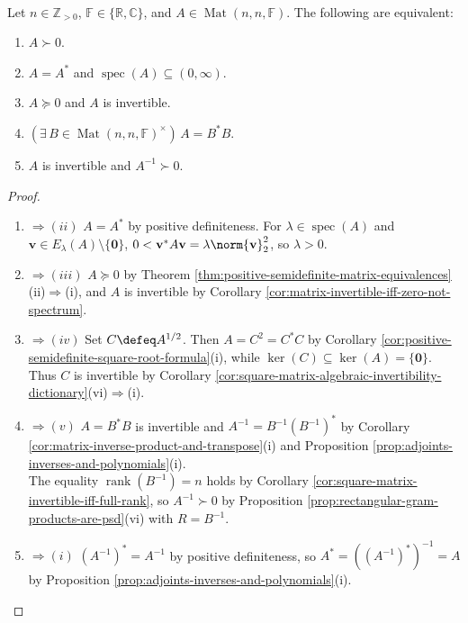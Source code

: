 \begin{theorem} \label{thm:positive-definite-matrix-equivalences} \\
Let $n\in\mathbb{Z}_{>0}$, $\mathbb{F}\in\{\mathbb{R},\mathbb{C}\}$, and $A\in\operatorname{Mat}(n,n,\mathbb{F})$. The following are equivalent:
\begin{enumerate}[label=(\roman*)]
\setlength{\itemsep}{0pt}
\item $A\succ0$.
\item $A=A^*$ and $\operatorname{spec}(A)\subseteq(0,\infty)$.
\item $A\succeq0$ and $A$ is invertible.
\item $(\exists\,B\in\operatorname{Mat}(n,n,\mathbb{F})^\times)\,A=B^*B$.
\item $A$ is invertible and $A^{-1}\succ0$.
\end{enumerate}
\begin{proof}
\begin{enumerate}[label=(\roman*)]
\setlength{\itemsep}{0pt}
\item[$(i)$]$\Rightarrow (ii)$ $A=A^*$ by positive definiteness. For $\lambda\in\operatorname{spec}(A)$ and $\mathbf{v}\in E_\lambda(A)\setminus\{\mathbf{0}\}$, $0<\mathbf{v}^*A\mathbf{v}=\lambda\norm{\mathbf{v}}_2^2$, so $\lambda>0$. \item[$(ii)$]$\Rightarrow (iii)$ $A\succeq0$ by Theorem \ref{thm:positive-semidefinite-matrix-equivalences}(ii)$\Rightarrow$(i), and $A$ is invertible by Corollary \ref{cor:matrix-invertible-iff-zero-not-spectrum}. 
\item[$(iii)$]$\Rightarrow (iv)$ Set $C\defeq A^{1/2}$. Then $A=C^2=C^*C$ by Corollary \ref{cor:positive-semidefinite-square-root-formula}(i), while $\ker(C)\subseteq\ker(A)=\{\mathbf{0}\}$.\\
Thus $C$ is invertible by Corollary \ref{cor:square-matrix-algebraic-invertibility-dictionary}(vi)$\Rightarrow$(i). 
\item[$(iv)$]$\Rightarrow (v)$ $A=B^*B$ is invertible and $A^{-1}=B^{-1}(B^{-1})^*$ by Corollary \ref{cor:matrix-inverse-product-and-transpose}(i) and Proposition \ref{prop:adjoints-inverses-and-polynomials}(i).\\
The equality $\operatorname{rank}(B^{-1})=n$ holds by Corollary \ref{cor:square-matrix-invertible-iff-full-rank}, so $A^{-1}\succ0$ by Proposition \ref{prop:rectangular-gram-products-are-psd}(vi) with $R=B^{-1}$.
 \item[$(v)$]$\Rightarrow (i)$ $(A^{-1})^*=A^{-1}$ by positive definiteness, so $A^*=((A^{-1})^*)^{-1}=A$ by Proposition \ref{prop:adjoints-inverses-and-polynomials}(i).\\

\end{enumerate}
\end{proof}
\end{theorem}
